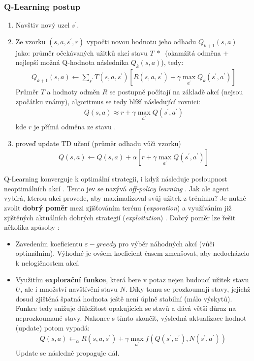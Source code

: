 \subsubsection{Q-Learning postup}
\label{teorie:qlearning}
\begin{enumerate}
  \item Navštiv nový uzel $s^\prime$.
  \item Ze vzorku $(s,a,s^\prime,r)$ vypočti novou hodnotu jeho odhadu $Q_{k+1}(s,a)$ jako:
  \newline
    průměr očekávaných užitků akcí stavu $T\:*\:$ (okamžitá odměna $+$ nejlepší možná Q-hodnota následníka $Q_{k}(s,a)$), tedy:
    \begin{align}
    Q_{k+1}(s,a) \leftarrow \sum_{s^\prime} T(s,a,s^\prime) \left[ R(s,a,s^\prime) + \gamma \max_{a^\prime} Q_k(s^\prime,a^\prime)\right]
    \end{align}
    Průměr $T$ a hodnoty odměn $R$ se postupně počítají na základě akcí (nejsou zpočátku známy), algoritmus se tedy blíží následující rovnici:
    \begin{align}
    Q(s,a) \approx r + \gamma \max_{a^\prime}Q(s^\prime,a^\prime)
    \end{align}
    kde $r$ je přímá odměna ze stavu \cite{imrewards}.
  \item proveď update TD učení (průměr odhadu vůči vzorku)
    \begin{align}
    \label{eq:qupdate}
     Q(s,a) \leftarrow  Q(s,a) + \alpha \left [ r + \gamma \max_{a^\prime} Q(s^\prime,a^\prime) \right]
    \end{align}
\end{enumerate}
Q-Learning konverguje k optimální strategii, i když následuje posloupnost neoptimálních akcí \cite{qlearnspringer}. Tento jev se nazývá \textit{off-policy learning} \cite{RLIntro}.
Jak ale agent vybírá, kterou akci provede, aby maximalizoval svůj užitek z tréninku? Je nutné zvolit \textbf{dobrý poměr} mezi zjišťováním terénu (\textit{exporation}) a využíváním již zjištěných aktuálních dobrých strategií (\textit{exploitation}) \cite{RLpaper}. Dobrý poměr lze řešit několika způsoby \cite{berkeley}:
\begin{itemize}
  \item Zavedením koeficientu $\varepsilon-greedy$ pro výběr náhodných akcí (vůči optimálním). Výhodné je ovšem koeficient časem zmenšovat, aby nedocházelo k nelogičnostem akcí.
  \item Využitím \textbf{explorační funkce}, která bere v potaz nejen budoucí užitek stavu $U$, ale i množství navštívění stavu $N$. Díky tomu se prozkoumají stavy, jejichž dosud zjištěná špatná hodnota ještě není úplně stabilní (málo výskytů). Funkce tedy snižuje důležitost opakujících se stavů a dává větší důraz na neprozkoumané stavy. Nakonec s tímto skončit, výsledná aktualizace hodnot (update) potom vypadá:
  \begin{align}
  Q(s,a) \leftarrow_\alpha R(s,a,s^\prime) + \gamma \max_{a^\prime} f(Q(s^\prime,a^\prime),N(s^\prime,a^\prime))\
  \end{align}
  Update se následně propaguje dál.
\end{itemize}
